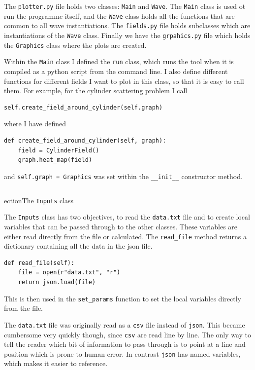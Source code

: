 The \verb!plotter.py! file holds two classes: \verb!Main! and \verb!Wave!. The \verb!Main! class is used ot run the programme itself, and the \verb!Wave! class holds all the functions that are common to all wave instantiations. The \verb!fields.py! file holds subclasses which are instantiations of the \verb!Wave! class. Finally we have the \verb!grpahics.py! file which holds the \verb!Graphics! class where the plots are created.

Within the \verb!Main! class I defined the \verb!run! class, which runs the tool when it is compiled as a python script from the command line. I also define different functions for different fields I want to plot in this class, so that it is easy to call them. For example, for the cylinder scattering problem I call

  \begin{lstlisting}
self.create_field_around_cylinder(self.graph) \end{lstlisting}
where I have defined
  \begin{lstlisting}
def create_field_around_cylinder(self, graph):
    field = CylinderField()
    graph.heat_map(field) \end{lstlisting}
and \verb!self.graph = Graphics! was set within the \verb!__init__! constructor method.



\subsection{}ection{The \texttt{Inputs} class}

The \verb!Inputs! class has two objectives, to read the \verb!data.txt! file and to create local variables that can be passed through to the other classes. These variables are either read directly from the file or calculated. The \verb!read_file! method returns a dictionary containing all the data in the json file.

\begin{lstlisting}
def read_file(self):
    file = open(r"data.txt", "r")
    return json.load(file)\end{lstlisting}

This is then used in the \verb!set_params! function to set the local variables directly from the file.

The \verb!data.txt! file was originally read as a \verb!csv! file instead of \verb!json!. This became cumbersome very quickly though, since \verb!csv! are read line by line. The only way to tell the reader which bit of information to pass through is to point at a line and position which is prone to human error. In contrast \verb!json! has named variables, which makes it easier to reference.

